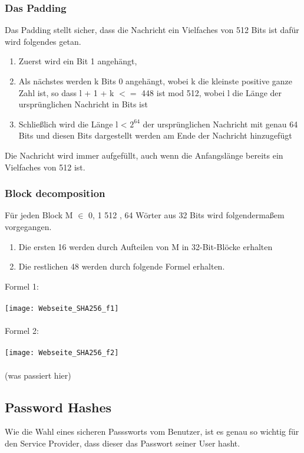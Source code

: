 {\subsubsection{Das Padding}
\label{sec:hash_padd}
Das Padding stellt sicher, dass die Nachricht ein Vielfaches von 512 Bits ist dafür wird folgendes getan.
\begin{enumerate}
\item Zuerst wird ein Bit 1 angehängt,
\item Als nächstes werden k Bits 0 angehängt, wobei k die kleinste positive ganze Zahl ist, so dass l + 1 + k $<=$ 448 ist
mod 512, wobei l die Länge der ursprünglichen Nachricht in Bits ist
\item Schließlich wird die Länge l < $2^{64}$ der ursprünglichen Nachricht mit genau 64 Bits und diesen Bits dargestellt
werden am Ende der Nachricht hinzugefügt
\end{enumerate}
Die Nachricht wird immer aufgefüllt, auch wenn die Anfangslänge bereits ein Vielfaches von 512 ist.
\subsubsection{Block decomposition}
\label{sec:hash_block_deco}
Für jeden Block M $\in$ {0, 1} 512 , 64 Wörter aus 32 Bits wird folgendermaßem vorgegangen. 

\begin{enumerate}
\item Die ersten 16 werden durch Aufteilen von M in 32-Bit-Blöcke erhalten
\item Die restlichen 48 werden durch folgende Formel erhalten.
\end{enumerate}
Formel 1:
\\ \\
\texttt{[image: Webseite\_SHA256\_f1]}
\\ \\Formel 2:\\ \\
\texttt{[image: Webseite\_SHA256\_f2]}
\\ \\
(was passiert hier)
\subsection{Password Hashes}
\label{sec:pwdhash}
Wie die Wahl eines sicheren Passsworts vom Benutzer, ist es genau so wichtig für den Service Provider, dass dieser das Passwort seiner User hasht.

}
